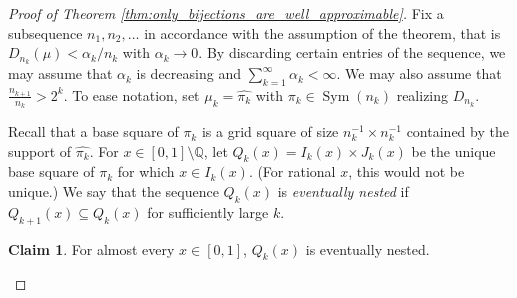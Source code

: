 \documentclass{article}
\newcommand{\Sym}{\mathop{\mathrm{Sym}}}
\theoremstyle{definition}
\newtheorem{claim}[theorem]{Claim}
\begin{document}
\begin{proof}[Proof of Theorem \ref{thm:only_bijections_are_well_approximable}]
    Fix a subsequence $n_1, n_2, \dots$ in accordance with the assumption of the theorem, that is $D_{n_k}(\mu)<\alpha_{k}/n_k$ with $\alpha_{k}\to 0$.
    By discarding certain entries of the sequence, we may assume that $\alpha_{k}$ is decreasing and $\sum_{k=1}^{\infty} \alpha_{k} < \infty$. We may also assume that $\frac{n_{k+1}}{n_k}>2^k$. To ease notation, set $\mu_{k} = \widehat{\pi_{k}}$ with $\pi_{k}\in \Sym(n_k)$ realizing $D_{n_k}$.

     Recall that a base square of $\pi_{k}$ is a grid square of size $n_k^{-1}\times n_k^{-1}$ contained by the support of $\widehat{\pi_k}$. For $x\in [0, 1]\setminus \mathbb{Q}$, let $Q_k(x)=I_k(x)\times J_k(x)$ be the unique base square of $\pi_{k}$ for which $x\in I_k(x)$. (For rational $x$, this would not be unique.) We say that the sequence $Q_k(x)$ is \emph{eventually nested} if $Q_{k+1}(x)\subseteq Q_k(x)$ for sufficiently large $k$.

    \begin{claim}\label{claim:stab}
        For almost every $x\in [0, 1]$, $Q_k(x)$ is eventually nested.
    \end{claim}


\end{proof}
\end{document}
